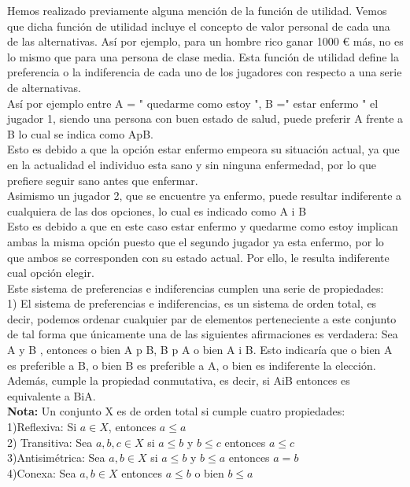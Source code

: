 \documentclass[10pt,a4paper]{book}
\begin{document}
Hemos realizado previamente alguna mención de la función de utilidad. Vemos que  dicha función de utilidad incluye el concepto de valor personal de cada una de las alternativas. Así por ejemplo, para un hombre rico ganar 1000 € más, no es lo mismo que para una persona de clase media. Esta función de utilidad define la preferencia o la indiferencia de cada uno de los jugadores con respecto a una serie de alternativas.\\ 
Así por ejemplo entre A = " quedarme como estoy ",  B =" estar enfermo "  el jugador 1, siendo una persona con buen estado de salud, puede preferir A frente a B lo cual se indica como ApB. \\
Esto es debido a que la opción estar enfermo empeora su situación actual, ya que en la actualidad el individuo esta sano y sin ninguna enfermedad, por lo que prefiere seguir sano antes que enfermar.\\
Asimismo un jugador 2, que se encuentre ya enfermo, puede resultar indiferente a cualquiera de las dos opciones, lo cual es indicado como A i B\\
Esto es debido a que en este caso estar enfermo y quedarme como estoy implican ambas la misma opción puesto que el segundo jugador ya esta enfermo, por lo que ambos se corresponden con su estado actual. Por ello, le resulta indiferente cual opción elegir.\\
Este sistema de preferencias e indiferencias cumplen una serie de propiedades:\\

1) El sistema de preferencias e indiferencias, es un sistema de orden total, es decir, podemos ordenar cualquier par de elementos perteneciente a este conjunto de tal forma que únicamente una de las siguientes afirmaciones es verdadera:
Sea A y B , entonces o bien A p B, B p A o bien A i B. Esto indicaría que o bien A es preferible a B, o bien B es preferible a A, o bien es indiferente la elección.\\

Además, cumple la propiedad conmutativa, es decir, si AiB entonces es equivalente a BiA.\\

\textbf{Nota:} Un conjunto X es de orden total si cumple cuatro propiedades:\\
\hfill 1)Reflexiva: Si $a \in X$, entonces $a \leq a$\\
\hfill 2) Transitiva: Sea $a,b,c \in X$ si $a \leq b$ y $b \leq c$ entonces $a \leq c$\\
\hfill 3)Antisimétrica: Sea $a,b \in X$ si $a \leq b$ y $b \leq a$ entonces $a=b$\\
\hfill 4)Conexa: Sea $a,b \in X$ entonces $a \leq b$ o bien $b \leq a$\\
\end{document}
